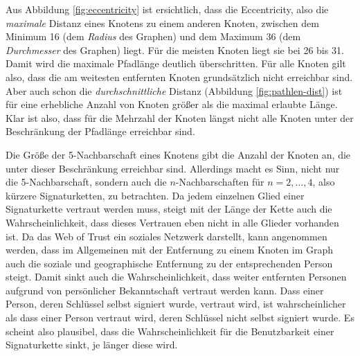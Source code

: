 Aus Abbildung \ref{fig:eccentricity} ist ersichtlich, dass die
Eccentricity, also die \emph{maximale} Distanz eines Knotens zu
einem anderen Knoten, zwischen dem Minimum 16 (dem \emph{Radius}
des Graphen) und dem Maximum 36 (dem \emph{Durchmesser} des Graphen)
liegt. Für die meisten Knoten liegt sie bei 26 bis 31. Damit wird
die maximale Pfadlänge deutlich überschritten. Für alle Knoten
gilt also, dass die am weitesten entfernten Knoten grundsätzlich
nicht erreichbar sind. Aber auch schon die \emph{durchschnittliche}
Distanz (Abbildung \ref{fig:pathlen-dist}) ist für eine erhebliche
Anzahl von Knoten größer als die maximal erlaubte Länge. Klar ist
also, dass für die Mehrzahl der Knoten längst nicht alle Knoten
unter der Beschränkung der Pfadlänge erreichbar sind.

Die Größe der 5-Nachbarschaft eines Knotens gibt die Anzahl der
Knoten an, die unter dieser Beschränkung erreichbar sind. Allerdings
macht es Sinn, nicht nur die 5-Nachbarschaft, sondern auch die
$n$-Nachbarschaften für $n=2,\dots,4$, also kürzere
Signaturketten, zu betrachten. Da jedem einzelnen Glied einer
Signaturkette vertraut werden muss, steigt mit der Länge der Kette
auch die Wahrscheinlichkeit, dass dieses Vertrauen eben nicht in alle
Glieder vorhanden ist. Da das Web of Trust ein soziales Netzwerk
darstellt, kann angenommen werden, dass im Allgemeinen mit der
Entfernung zu einem Knoten im Graph auch die soziale und geographische
Entfernung zu der entsprechenden Person steigt. Damit sinkt auch die
Wahrscheinlichkeit, dass weiter entfernten Personen aufgrund von
persönlicher Bekanntschaft vertraut werden kann. Dass einer Person,
deren Schlüssel selbst signiert wurde, vertraut wird, ist
wahrscheinlicher als dass einer Person vertraut wird, deren
Schlüssel nicht selbst signiert wurde. Es scheint also plausibel, dass
die Wahrscheinlichkeit f\"ur die Benutzbarkeit einer Signaturkette
sinkt, je l\"anger diese wird. 

